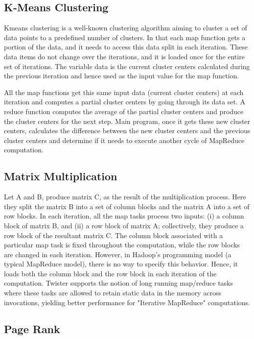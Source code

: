 \documentclass[9pt,twocolumn,twoside]{styles/osajnl}
\begin{document}
\subsection{K-Means Clustering}
Kmeans clustering is a well-known clustering algorithm aiming to
cluster a set of data points to a predefined number of clusters. In
that each map function gets a portion of the data, and it needs to
access this data split in each iteration. These data items do not
change over the iterations, and it is loaded once for the entire set
of iterations. The variable data is the current cluster centers
calculated during the previous iteration and hence used as the input
value for the map function\cite{twister}\cite{dean2008mapreduce}.

All the map functions get this same input data (current cluster
centers) at each iteration and computes a partial cluster centers by
going through its data set. A reduce function computes the average of
the partial cluster centers and produce the cluster centers for the
next step. Main program, once it gets these new cluster centers,
calculates the difference between the new cluster centers and the
previous cluster centers and determine if it needs to execute another
cycle of MapReduce
computation\cite{ekanayake2008mapreduce}\cite{twister}.


\subsection{Matrix Multiplication}
Let A and B, produce matrix C, as the result of the multiplication
process. Here they split the matrix B into a set of column blocks and
the matrix A into a set of row blocks. In each iteration, all the map
tasks process two inputs: (i) a column block of matrix B, and (ii) a
row block of matrix A; collectively, they produce a row block of the
resultant matrix C. The column block associated with a particular map
task is fixed throughout the computation, while the row blocks are
changed in each iteration. However, in Hadoop's programming model (a
typical MapReduce model), there is no way to specify this behavior.
Hence, it loads both the column block and the row block in each
iteration of the computation. Twister supports the notion of long
running map/reduce tasks where these tasks are allowed to retain
static data in the memory across invocations, yielding better
performance for "Iterative MapReduce"
computations\cite{dean2008mapreduce}\cite{twister}.

\subsection{Page Rank}
\end{document}
